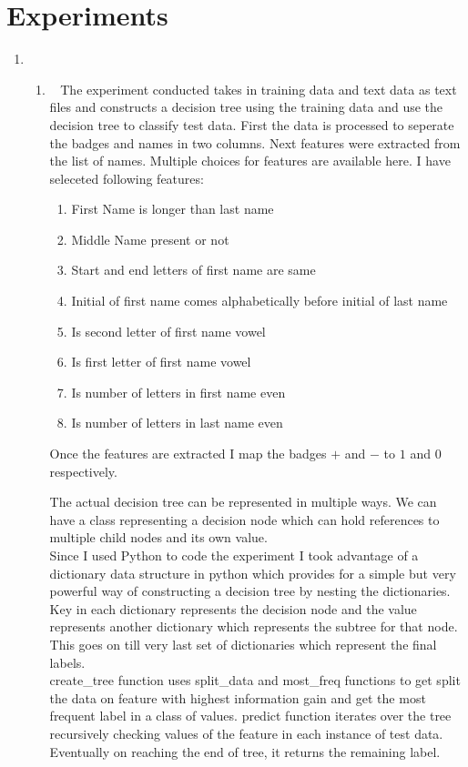 \section{Experiments}
\label{sec:q3}

\begin{enumerate}
    \item~
    \begin{enumerate}
        \item~ 
        The experiment conducted takes in training data and text data as text files and constructs a decision tree using the training data and use the decision tree to classify test data. First the data is processed to seperate the badges and names in two columns. 
        Next features were extracted from the list of names. Multiple choices for features are available here. I have seleceted following features: 
        \begin{enumerate}
        \item First Name is longer than last name
        \item Middle Name present or not
        \item Start and end letters of first name are same
        \item Initial of first name comes alphabetically before initial of last name
        \item Is second letter of first name vowel
        \item Is first letter of first name vowel
        \item Is number of letters in first name even
        \item Is number of letters in last name even
        \end{enumerate}

		Once the features are extracted I map the badges $+$ and $-$ to $1$ and $0$ respectively. 
		
		The actual decision tree can be represented in multiple ways. We can have a class representing a decision node which can hold references to multiple child nodes and its own value.\\
		Since I used Python to code the experiment I took advantage of a dictionary data structure in python which provides for a simple but very powerful way of constructing a decision tree by nesting the dictionaries.\\
		Key in each dictionary represents the decision node and the value represents another dictionary which represents the subtree for that node. This goes on till very last set of dictionaries which represent the final labels.\\
		create_tree function uses split_data and most_freq functions to get split the data on feature with highest information gain and get the most frequent label in a class of values. predict function iterates over the tree recursively checking values of the feature in each instance of test data. Eventually on reaching the end of tree, it returns the remaining label. 
        

\end{enumerate}
\end{enumerate}
